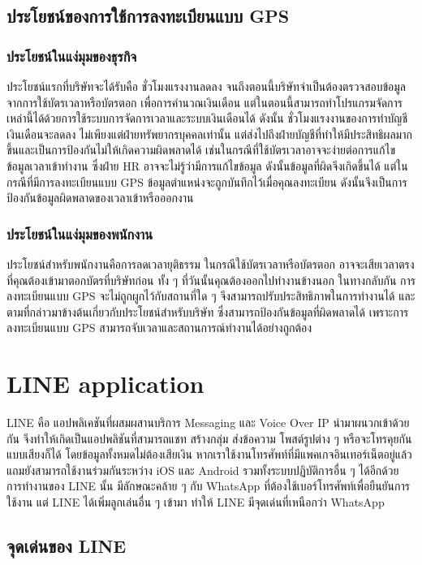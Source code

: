 \subsection{ประโยชน์ของการใช้การลงทะเบียนแบบ GPS}
\subsubsection{ประโยชน์ในแง่มุมของธุรกิจ}
\quad ประโยชน์แรกที่บริษัทจะได้รับคือ ชั่วโมงแรงงานลดลง จนถึงตอนนี้บริษัทจำเป็นต้องตรวจสอบข้อมูลจากการใช้บัตรเวลาหรือบัตรตอก เพื่อการคํานวณเงินเดือน แต่ในตอนนี้สามารถทำโปรแกรมจัดการเหล่านี้ได้ด้วยการใช้ระบบการจัดการเวลาและระบบเงินเดือนได้ ดังนั้น ชั่วโมงแรงงานของการทำบัญชีเงินเดือนจะลดลง ไม่เพียงแต่ฝ่ายทรัพยากรบุคคลเท่านั้น แต่ส่งไปถึงฝ่ายบัญชีที่ทำให้มีประสิทธิผลมากขึ้นและเป็นการป้องกันไม่ให้เกิดความผิดพลาดได้ เช่นในกรณีที่ใช้บัตรเวลาอาจจะง่ายต่อการแก้ไขข้อมูลเวลาเข้าทำงาน ซึ่งฝ่าย HR อาจจะไม่รู้ว่ามีการแก้ไขข้อมูล ดังนั้นข้อมูลที่ผิดจึงเกิดขึ้นได้ แต่ในกรณีที่มีการลงทะเบียนแบบ GPS ข้อมูลตำแหน่งจะถูกบันทึกไว้เมื่อคุณลงทะเบียน ดังนั้นจึงเป็นการป้องกันข้อมูลผิดพลาดของเวลาเข้าหรือออกงาน 
\subsubsection{ประโยชน์ในแง่มุมของพนักงาน}
\quad ประโยชน์สำหรับพนักงานคือการลดเวลายุติธรรม ในกรณีใช้บัตรเวลาหรือบัตรตอก อาจจะเสียเวลาตรงที่คุณต้องเข้ามาตอกบัตรที่บริษัทก่อน ทั้ง ๆ ที่วันนั้นคุณต้องออกไปทำงานข้างนอก ในทางกลับกัน การลงทะเบียนแบบ GPS จะไม่ถูกผูกไว้กับสถานที่ใด ๆ จึงสามารถปรับประสิทธิภาพในการทำงานได้  และตามที่กล่าวมาข้างต้นเกี่ยวกับประโยชน์สำหรับบริษัท ซึ่งสามารถป้องกันข้อมูลที่ผิดพลาดได้ เพราะการลงทะเบียนแบบ GPS สามารถจับเวลาและสถานการณ์ทำงานได้อย่างถูกต้อง 
\cite{hrnotegps}
\section{LINE application}
\quad LINE คือ แอปพลิเคชันที่ผสมผสานบริการ Messaging และ Voice Over IP นำมาผนวกเข้าด้วยกัน จึงทำให้เกิดเป็นแอปพลิชันที่สามารถแชท สร้างกลุ่ม ส่งข้อความ โพสต์รูปต่าง ๆ  หรือจะโทรคุยกันแบบเสียงก็ได้  โดยข้อมูลทั้งหมดไม่ต้องเสียเงิน หากเราใช้งานโทรศัพท์ที่มีแพคเกจอินเทอร์เน็ตอยู่แล้ว แถมยังสามารถใช้งานร่วมกันระหว่าง iOS และ Android รวมทั้งระบบปฏิบัติการอื่น ๆ ได้อีกด้วย การทำงานของ LINE นั้น มีลักษณะคล้าย ๆ กับ WhatsApp ที่ต้องใช้เบอร์โทรศัพท์เพื่อยืนยันการใช้งาน แต่ LINE ได้เพิ่มลูกเล่นอื่น ๆ เข้ามา ทำให้ LINE มีจุดเด่นที่เหนือกว่า WhatsApp  

\subsection{จุดเด่นของ LINE} 
